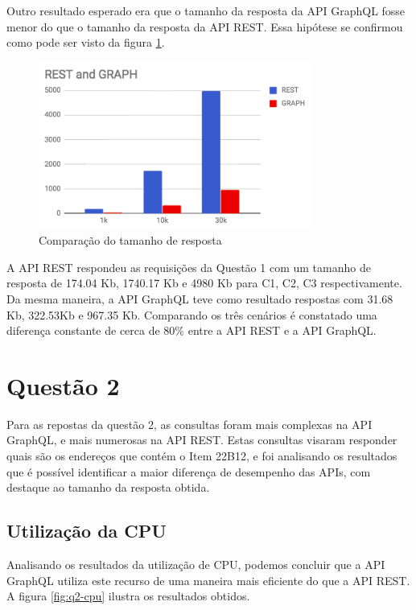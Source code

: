 Outro resultado esperado era que o tamanho da resposta da API GraphQL fosse menor do que o tamanho da resposta da API REST. Essa hipótese se confirmou como pode ser visto da figura \ref{fig:q1-size}.

\begin{figure}[htbp]
    \centering
    \includegraphics[width=0.8\textwidth]{figuras/Q1-size.png}
    \caption{Comparação do tamanho de resposta}
    \label{fig:q1-size}
    \author{fonte: Autor}
\end{figure}

A API REST respondeu as requisições da Questão 1 com um tamanho de resposta de 174.04 Kb, 1740.17 Kb e 4980 Kb para C1, C2, C3 respectivamente. Da mesma maneira, a API GraphQL teve como resultado respostas com 31.68 Kb, 322.53Kb e 967.35 Kb. Comparando os três cenários é constatado uma diferença constante de cerca de 80\% entre a API REST e a API GraphQL.


\section{Questão 2}

Para as repostas da questão 2, as consultas foram mais complexas na API GraphQL, e mais numerosas na API REST. Estas consultas visaram responder quais são os endereços que contém o Item 22B12, e foi analisando os resultados que é possível identificar a maior diferença de desempenho das APIs, com destaque ao tamanho da resposta obtida.

\subsection{Utilização da CPU}

Analisando os resultados da utilização de CPU, podemos concluir que a API GraphQL utiliza este recurso de uma maneira mais eficiente do que a API REST. A figura \ref{fig:q2-cpu} ilustra os resultados obtidos.

